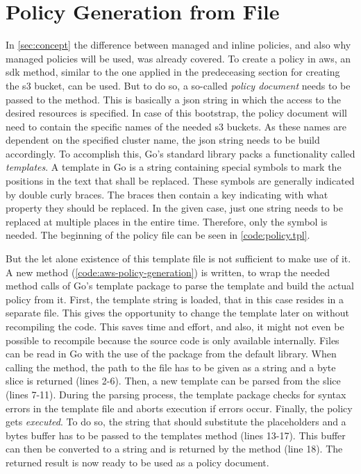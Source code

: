 \section{Policy Generation from File}
In \autoref{sec:concept} the difference between managed and inline policies, and also why managed policies will be used, was already covered.
To create a policy in \ac{aws}, an \ac{sdk} method, similar to the one applied in the predeceasing section for creating the \ac{s3} bucket, can be used.
But to do so, a so-called \emph{policy document} needs to be passed to the method.
This is basically a \ac{json} string in which the access to the desired resources is specified.
In case of this bootstrap, the policy document will need to contain the specific names of the needed \ac{s3} buckets.
As these names are dependent on the specified cluster name, the \ac{json} string needs to be build accordingly.
To accomplish this, Go's standard library packs a functionality called \emph{templates}.
A template in Go is a string containing special symbols to mark the positions in the text that shall be replaced.
These symbols are generally indicated by double curly braces.
The braces then contain a key indicating with what property they should be replaced.
In the given case, just one string needs to be replaced at multiple places in the entire time.
Therefore, only the symbol  is needed.
The beginning of the policy file can be seen in \autoref{code:policy.tpl}.



But the let alone existence of this template file is not sufficient to make use of it.
A new method (\autoref{code:aws-policy-generation}) is written, to wrap the needed method calls of Go's template package to parse the template and build the actual policy from it.
First, the template string is loaded, that in this case resides in a separate file.
This gives the opportunity to change the template later on without recompiling the code.
This saves time and effort, and also, it might not even be possible to recompile because the source code is only available internally.
Files can be read in Go with the use of the  package from the default library.
When calling the  method, the path to the file has to be given as a string and a byte slice is returned (lines 2-6).
Then, a new template can be parsed from the slice (lines 7-11).
During the parsing process, the template package checks for syntax errors in the template file and aborts execution if errors occur.
Finally, the policy gets \emph{executed}.
To do so, the string that should substitute the placeholders and a bytes buffer has to be passed to the templates  method (lines 13-17).
This buffer can then be converted to a string and is returned by the method (line 18).
The returned result is now ready to be used as a policy document.

